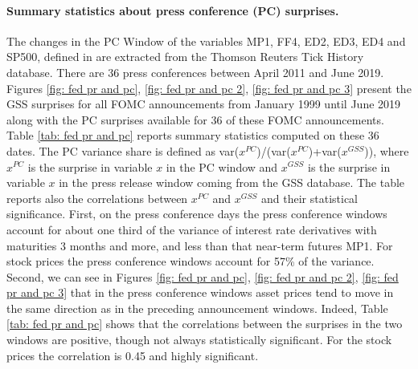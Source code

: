 \documentclass[a4paper,12pt]{article}
\begin{document}
\paragraph{Summary statistics about press conference (PC) surprises.} 
The changes in the PC Window of the variables MP1, FF4, ED2, ED3, ED4 and SP500, defined in \cite{Gurkaynak_Sack_Swanson_2005a} are extracted from the Thomson Reuters Tick History database.
There are 36 press conferences between April 2011 and June 2019.
Figures \ref{fig: fed pr and pc}, \ref{fig: fed pr and pc 2}, \ref{fig: fed pr and pc 3} 
present the GSS surprises for all FOMC announcements from January 1999 until June 2019 along with the PC surprises available for 36 of these FOMC announcements.
Table \ref{tab: fed pr and pc} reports summary statistics computed on these 36 dates.
The PC variance share is defined as var($x^{PC}$)/(var($x^{PC}$)+var($x^{GSS}$)),
where $x^{PC}$ is the surprise in variable $x$ in the PC window and
$x^{GSS}$ is the surprise in variable $x$ in the press release window coming from the GSS database.
The table reports also the correlations between $x^{PC}$ and $x^{GSS}$ and their statistical significance.
First, on the press conference days the press conference windows
account for about one third of the variance of interest rate derivatives with maturities 3 months and more,
and less than that near-term futures MP1. For stock prices the press conference windows
account for 57\% of the variance.
Second, we can see in Figures \ref{fig: fed pr and pc}, \ref{fig: fed pr and pc 2}, \ref{fig: fed pr and pc 3} that in the press conference windows asset prices tend to move
in the same direction as in the preceding announcement windows. 
Indeed, Table \ref{tab: fed pr and pc}
shows that the correlations between the surprises in the two windows are positive, though not always statistically significant.
For the stock prices the correlation is 0.45 and highly significant.
\end{document}
